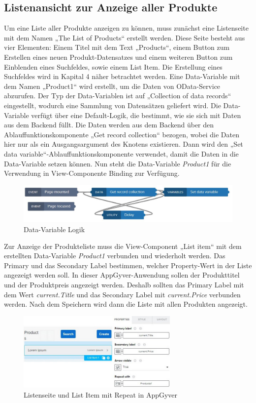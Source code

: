 \subsection{Listenansicht zur Anzeige aller Produkte}
Um eine Liste aller Produkte anzeigen zu können, muss zunächst eine Listenseite mit dem Namen „The List of Products“ erstellt werden. Diese Seite besteht aus vier Elementen: Einem Titel mit dem Text „Products“, einem Button zum Erstellen eines neuen Produkt-Datensatzes und einem weiteren Button zum Einblenden eines Suchfeldes, sowie einem List Item. Die Erstellung eines Suchfeldes wird in Kapital 4 näher betrachtet werden. Eine Data-Variable mit dem Namen „Product1“ wird erstellt, um die Daten von OData-Service abzurufen. Der Typ der Data-Variablen ist auf „Collection of data records“ eingestellt, wodurch eine Sammlung von Datensätzen geliefert wird. Die Data-Variable verfügt über eine Default-Logik, die bestimmt, wie sie sich mit Daten aus dem Backend füllt. Die Daten werden aus dem Backend über den Ablauffunktionskomponente „Get record collection“ bezogen, wobei die Daten hier nur als ein Ausgangsargument des Knotens existieren. Dann wird den „Set data variable“-Ablauffunktionskomponente verwendet, damit die Daten in die Data-Variable setzen können. Nun steht die Data-Variable \textit{Product1} für die Verwendung in View-Componente Binding zur Verfügung.

\begin{figure}[htbp]
 \centering
 \includegraphics[width=1.0\textwidth]{Bilder/appgyver/3_12_Data_Variable_Logik.jpg}
 \caption{Data-Variable Logik}
\end{figure}

Zur Anzeige der Produkteliste muss die View-Component „List item“ mit dem erstellten Data-Variable \textit{Product1} verbunden und  wiederholt werden. Das Primary  und das Secondary Label bestimmen, welcher Property-Wert in der Liste angezeigt werden soll. In dieser AppGyver-Anwendung sollen der Produkttitel und der Produktpreis angezeigt werden. Deshalb sollten das Primary Label mit dem Wert \textit{current.Title} und das Secondary Label mit \textit{current.Price} verbunden werden. Nach dem Speichern wird dann die Liste mit allen Produkten angezeigt.  

\begin{figure}[htbp]
 \centering
 \includegraphics[width=0.7\textwidth]{Bilder/appgyver/3_13_List_Item_mit_Repeat.jpg}
 \caption{Listenseite und List Item mit Repeat in AppGyver}
\end{figure}

